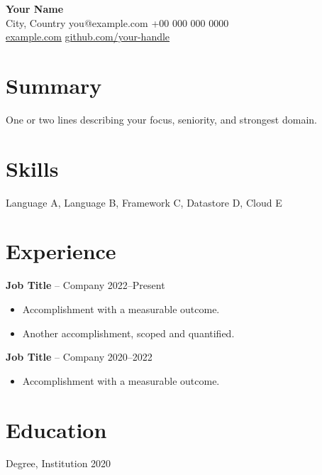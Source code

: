 \documentclass[11pt]{article}
\begin{document}
\begin{center}
  {\Large \textbf{Your Name}}\\[2pt]
  City, Country \textbar{} you@example.com \textbar{} +00 000 000 0000\\
  \href{https://example.com}{example.com} \textbar{} \href{https://github.com/your-handle}{github.com/your-handle}
\end{center}

\section*{Summary}
One or two lines describing your focus, seniority, and strongest domain.

\section*{Skills}
Language A, Language B, Framework C, Datastore D, Cloud E

\section*{Experience}
\textbf{Job Title} -- Company \hfill 2022--Present
\begin{itemize}
  \item Accomplishment with a measurable outcome.
  \item Another accomplishment, scoped and quantified.
\end{itemize}

\textbf{Job Title} -- Company \hfill 2020--2022
\begin{itemize}
  \item Accomplishment with a measurable outcome.
\end{itemize}

\section*{Education}
Degree, Institution \hfill 2020
\end{document}
